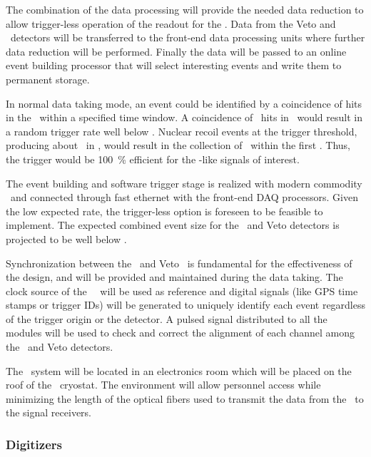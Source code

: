 The combination of the data processing will provide the needed data reduction to allow trigger-less operation of the readout for the \TPC.  Data from the Veto and \TPC\ detectors will be transferred to the front-end data processing units where further data reduction will be performed.  Finally the data will be passed to an online event building processor that will select interesting events and write them to permanent storage.

In normal data taking mode, an event could be identified by a coincidence of hits in the \TPC\ within a specified time window.  A coincidence of \DSkTriggerThresholdHits\ hits in \DSkTriggerThresholdWindow\ would result in a random trigger rate well below \DSkTriggerRandomRate.  Nuclear recoil events at the trigger threshold, producing about \DSkWIMPMinPE\ in \DSkWIMPMinPETimeWindow, would result in the collection of \DSkWIMPMinTwoHundredns\ within the first \DSkTriggerThresholdWindow.  Thus, the trigger would be \SI{100}{\percent} efficient for the \WIMP-like signals of interest.  

The event building and software trigger stage is realized with modern commodity \CPUs\ and connected through fast ethernet with the front-end DAQ processors.  Given the low expected rate, the trigger-less option is foreseen to be feasible to implement.  The expected combined event size for the \TPC\ and Veto detectors is projected to be well below \DSkDAQGlobalEventSizeUpperLimit.

Synchronization between the \TPC\ and Veto \DAQ\ is fundamental for the effectiveness of the design, and will be provided and maintained during the data taking.  The clock source of the \TPC\ \DAQ\ will be used as reference and digital signals (like GPS time stamps or trigger IDs) will be generated to uniquely identify each event regardless of the trigger origin or the detector.  A pulsed signal distributed to all the modules will be used to check and correct the alignment of each channel among the \TPC\ and Veto detectors.

The \DAQ\ system will be located in an electronics room which will be placed on the roof of the \AAr\ cryostat.  The environment will allow personnel access while minimizing the length of the optical fibers used to transmit the data from the \TPC\ to the signal receivers.


\subsubsection{Digitizers}

